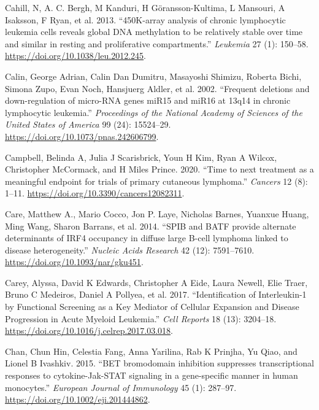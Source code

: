 \documentclass[11pt, a4paper, twosided]{book}
\newenvironment{CSLReferences}%
  {}%
  {\par}
\begin{document}
\begin{CSLReferences}{1}{0}
\leavevmode{}%
Cahill, N, A. C. Bergh, M Kanduri, H Göransson-Kultima, L Mansouri, A Isaksson, F Ryan, et al. 2013. {``{450K-array analysis of chronic lymphocytic leukemia cells reveals global DNA methylation to be relatively stable over time and similar in resting and proliferative compartments}.''} \emph{Leukemia} 27 (1): 150--58. \url{https://doi.org/10.1038/leu.2012.245}.

\leavevmode{}%
Calin, George Adrian, Calin Dan Dumitru, Masayoshi Shimizu, Roberta Bichi, Simona Zupo, Evan Noch, Hansjuerg Aldler, et al. 2002. {``{Frequent deletions and down-regulation of micro-RNA genes miR15 and miR16 at 13q14 in chronic lymphocytic leukemia}.''} \emph{Proceedings of the National Academy of Sciences of the United States of America} 99 (24): 15524--29. \url{https://doi.org/10.1073/pnas.242606799}.

\leavevmode{}%
Campbell, Belinda A, Julia J Scarisbrick, Youn H Kim, Ryan A Wilcox, Christopher McCormack, and H Miles Prince. 2020. {``{Time to next treatment as a meaningful endpoint for trials of primary cutaneous lymphoma}.''} \emph{Cancers} 12 (8): 1--11. \url{https://doi.org/10.3390/cancers12082311}.

\leavevmode{}%
Care, Matthew A., Mario Cocco, Jon P. Laye, Nicholas Barnes, Yuanxue Huang, Ming Wang, Sharon Barrans, et al. 2014. {``{SPIB and BATF provide alternate determinants of IRF4 occupancy in diffuse large B-cell lymphoma linked to disease heterogeneity}.''} \emph{Nucleic Acids Research} 42 (12): 7591--7610. \url{https://doi.org/10.1093/nar/gku451}.

\leavevmode{}%
Carey, Alyssa, David K Edwards, Christopher A Eide, Laura Newell, Elie Traer, Bruno C Medeiros, Daniel A Pollyea, et al. 2017. {``{Identification of Interleukin-1 by Functional Screening as a Key Mediator of Cellular Expansion and Disease Progression in Acute Myeloid Leukemia}.''} \emph{Cell Reports} 18 (13): 3204--18. \url{https://doi.org/10.1016/j.celrep.2017.03.018}.

\leavevmode{}%
Chan, Chun Hin, Celestia Fang, Anna Yarilina, Rab K Prinjha, Yu Qiao, and Lionel B Ivashkiv. 2015. {``{BET bromodomain inhibition suppresses transcriptional responses to cytokine-Jak-STAT signaling in a gene-specific manner in human monocytes.}''} \emph{European Journal of Immunology} 45 (1): 287--97. \url{https://doi.org/10.1002/eji.201444862}.


\end{CSLReferences}
\end{document}
